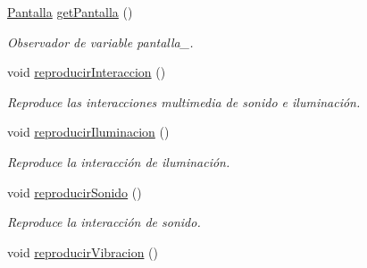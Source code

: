 \begin{DoxyCompactItemize}
\hyperlink{classPantalla}{Pantalla} \hyperlink{classInteraccion_a276d1a10b7df6037d55a4d6819138bc1}{get\+Pantalla} ()
\begin{DoxyCompactList}\small\item\em Observador de variable pantalla\+\_\+. \end{DoxyCompactList}\item 
void \hyperlink{classInteraccion_a201bf7c2fc701649fb636f2440f8b706}{reproducir\+Interaccion} ()\hypertarget{classInteraccion_a201bf7c2fc701649fb636f2440f8b706}{}\label{classInteraccion_a201bf7c2fc701649fb636f2440f8b706}

\begin{DoxyCompactList}\small\item\em Reproduce las interacciones multimedia de sonido e iluminación. \end{DoxyCompactList}\item 
void \hyperlink{classInteraccion_a46fe9723017b35ed447e377aef2a58e8}{reproducir\+Iluminacion} ()\hypertarget{classInteraccion_a46fe9723017b35ed447e377aef2a58e8}{}\label{classInteraccion_a46fe9723017b35ed447e377aef2a58e8}

\begin{DoxyCompactList}\small\item\em Reproduce la interacción de iluminación. \end{DoxyCompactList}\item 
void \hyperlink{classInteraccion_a2f70fe1701d309d606a3b86787e332cc}{reproducir\+Sonido} ()\hypertarget{classInteraccion_a2f70fe1701d309d606a3b86787e332cc}{}\label{classInteraccion_a2f70fe1701d309d606a3b86787e332cc}

\begin{DoxyCompactList}\small\item\em Reproduce la interacción de sonido. \end{DoxyCompactList}\item 
void \hyperlink{classInteraccion_a9be00864ffbe9dcc95d6d8153b6bed1e}{reproducir\+Vibracion} ()\hypertarget{classInteraccion_a9be00864ffbe9dcc95d6d8153b6bed1e}{}\label{classInteraccion_a9be00864ffbe9dcc95d6d8153b6bed1e}


\end{DoxyCompactItemize}
